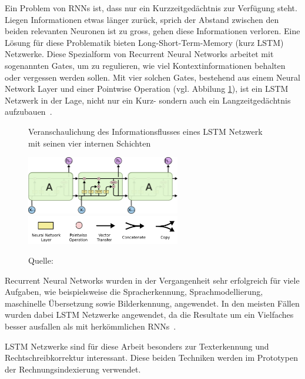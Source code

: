 Ein Problem von RNNs ist, dass nur ein Kurzzeitgedächtnis zur Verfügung steht. Liegen Informationen etwas länger zurück, sprich der Abstand zwischen den beiden relevanten Neuronen ist zu gross, gehen diese Informationen verloren. Eine Lösung für diese Problematik bieten Long-Short-Term-Memory (kurz LSTM) Netzwerke. Diese Spezialform von Recurrent Neural Networks arbeitet mit sogenannten Gates, um zu regulieren, wie viel Kontextinformationen behalten oder vergessen werden sollen. Mit vier solchen Gates, bestehend aus einem Neural Network Layer und einer Pointwise Operation (vgl. Abbilung \ref{lstm1}), ist ein LSTM Netzwerk in der Lage, nicht nur ein Kurz- sondern auch ein Langzeitgedächtnis aufzubauen~\autocite{Olah2015}.
\begin{figure}[h]
    \captionsetup{width=.8\linewidth}
    \caption{Veranschaulichung des Informationsflusses eines LSTM Netzwerk mit seinen vier internen Schichten}
    \label{lstm1}
    \centering
    \includegraphics[width=0.6\textwidth]{graphics/lstm.png}\\
    \vspace{0.5cm}
    \includegraphics[width=0.6\textwidth]{graphics/lstm-notation.png}\\
    \vspace{0.1cm}
    \caption*{Quelle: \textcite{Olah2015}}
\end{figure}

Recurrent Neural Networks wurden in der Vergangenheit sehr erfolgreich für viele Aufgaben, wie beispielsweise die Spracherkennung, Sprachmodellierung, maschinelle Übersetzung sowie Bilderkennung, angewendet. In den meisten Fällen wurden dabei LSTM Netzwerke angewendet, da die Resultate um ein Vielfaches besser ausfallen als mit herkömmlichen RNNs~\autocite{Olah2015}.

LSTM Netzwerke sind für diese Arbeit besonders zur Texterkennung und Rechtschreibkorrektur interessant. Diese beiden Techniken werden im Prototypen der Rechnungsindexierung verwendet.

